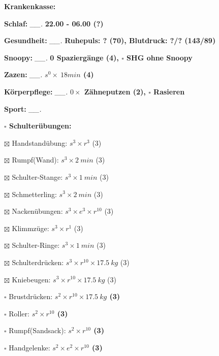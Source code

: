 \documentclass[10pt,a4paper]{article}
\newcommand\prop[1] {{\color {alizarin} {\bf #1}}}             %
\newcommand\mand[1] {{\color {burntorange} {\bf #1}}}          %
\newcommand\topspace{\vskip -15pt \hskip 20pt}
\newcommand\n[1] { {\sl #1.} \hskip 5pt }
\begin{document}
\begin{mdframed}[style=daystyle]
  \begin{labeling}{{\mand {Krankenkasse:}}}
    \setlength\itemsep{-3pt}
  \item[{\mand {Schlaf:}}]       \n{\_\_} {\prop {22.00 - 06.00 (?)}}
  \item[{\mand {Gesundheit:}}]   \n{\_\_} {\prop {Ruhepuls: ? (70), Blutdruck: ?/? (143/89)}}
  \item[{\mand {Snoopy:}}]       \n{\_\_} {\prop {0 Spaziergänge (4), $\square$ SHG ohne Snoopy}}    
  \item[{\mand {Zazen:}}]        \n{\_\_} {\prop {$s^0 \times\ 18 min$ (4)}}
  \item[{\mand {Körperpflege:}}] \n{\_\_} {\prop {$0 \times$ Zähneputzen (2), $\square$ Rasieren}}
  \item[{\mand {Sport:}}]        \n{\_\_}
    \topspace
    \begin{minipage}{0.75\textwidth}  
      \begin{labeling}{\prop {$\square$ {Schulterübungen:}}} 
        \setlength\itemsep{-3pt}
      \item[$\boxtimes$ Handstandübung:]  $s^3 \times r^{3}$ (3)
      \item[$\boxtimes$ Rumpf(Wand):]     $s^3 \times 2\ min$ (3)
      \item[$\boxtimes$ Schulter-Stange:] $s^3 \times 1\ min$ (3)
      \item[$\boxtimes$ Schmetterling:]   $s^3 \times 2\ min$ (3)
      \item[$\boxtimes$ Nackenübungen:]   $s^3 \times e^3 \times r^{10}$ (3)
      \item[$\boxtimes$ Klimmzüge:]       $s^3 \times r^1$ (3)
      \item[$\boxtimes$ Schulter-Ringe:]  $s^3 \times 1\ min$ (3)
      \item[$\boxtimes$ Schulterdrücken:] $s^3 \times r^{10} \times 17.5\ kg$ (3)
      \item[$\boxtimes$ Kniebeugen:]      $s^3 \times r^{10} \times 17.5\ kg$ (3)
      \item[$\square$ Brustdrücken:]    {\prop {$s^2 \times r^{10} \times 17.5\ kg$ (3)}}
      \item[$\square$ Roller:]          {\prop {$s^2 \times r^{10}$ (3)}}
      \item[$\square$ Rumpf(Sandsack):] {\prop {$s^2 \times r^{10}$ (3)}}
      \item[$\square$ Handgelenke:]     {\prop {$s^2 \times e^2 \times r^{10}$ (3)}}

\end{labeling}
\end{minipage}
\end{labeling}
\end{mdframed}
\end{document}

